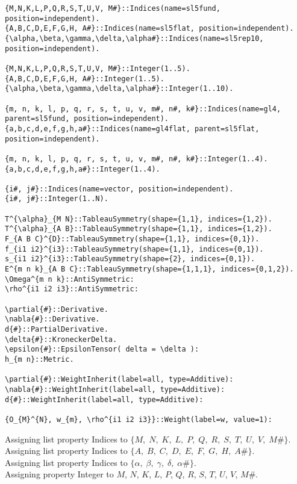 \documentclass[11pt]{article}
\begin{document}
{\color[named]{Blue}\begin{verbatim}
{M,N,K,L,P,Q,R,S,T,U,V, M#}::Indices(name=sl5fund, position=independent).
{A,B,C,D,E,F,G,H, A#}::Indices(name=sl5flat, position=independent).
{\alpha,\beta,\gamma,\delta,\alpha#}::Indices(name=sl5rep10, position=independent).

{M,N,K,L,P,Q,R,S,T,U,V, M#}::Integer(1..5).
{A,B,C,D,E,F,G,H, A#}::Integer(1..5).
{\alpha,\beta,\gamma,\delta,\alpha#}::Integer(1..10).

{m, n, k, l, p, q, r, s, t, u, v, m#, n#, k#}::Indices(name=gl4, parent=sl5fund, position=independent).
{a,b,c,d,e,f,g,h,a#}::Indices(name=gl4flat, parent=sl5flat, position=independent).

{m, n, k, l, p, q, r, s, t, u, v, m#, n#, k#}::Integer(1..4).
{a,b,c,d,e,f,g,h,a#}::Integer(1..4).

{i#, j#}::Indices(name=vector, position=independent).
{i#, j#}::Integer(1..N).

T^{\alpha}_{M N}::TableauSymmetry(shape={1,1}, indices={1,2}).
T^{\alpha}_{A B}::TableauSymmetry(shape={1,1}, indices={1,2}).
F_{A B C}^{D}::TableauSymmetry(shape={1,1}, indices={0,1}).
f_{i1 i2}^{i3}::TableauSymmetry(shape={1,1}, indices={0,1}).
s_{i1 i2}^{i3}::TableauSymmetry(shape={2}, indices={0,1}).
E^{m n k}_{A B C}::TableauSymmetry(shape={1,1,1}, indices={0,1,2}).
\Omega^{m n k}::AntiSymmetric:
\rho^{i1 i2 i3}::AntiSymmetric:

\partial{#}::Derivative.
\nabla{#}::Derivative.
d{#}::PartialDerivative.
\delta{#}::KroneckerDelta.
\epsilon{#}::EpsilonTensor( delta = \delta ):
h_{m n}::Metric.

\partial{#}::WeightInherit(label=all, type=Additive):
\nabla{#}::WeightInherit(label=all, type=Additive):
d{#}::WeightInherit(label=all, type=Additive):

{O_{M}^{N}, w_{m}, \rho^{i1 i2 i3}}::Weight(label=w, value=1):
\end{verbatim}}
Assigning list property Indices to $\{M,\; N,\; K,\; L,\; P,\; Q,\; R,\; S,\; T,\; U,\; V,\; M\#\}$.
\\
Assigning list property Indices to $\{A,\; B,\; C,\; D,\; E,\; F,\; G,\; H,\; A\#\}$.
\\
Assigning list property Indices to $\{\alpha,\; \beta,\; \gamma,\; \delta,\; \alpha\#\}$.
\\
Assigning property Integer to $M$, $N$, $K$, $L$, $P$, $Q$, $R$, $S$, $T$, $U$, $V$, $M\#$.
\end{document}

